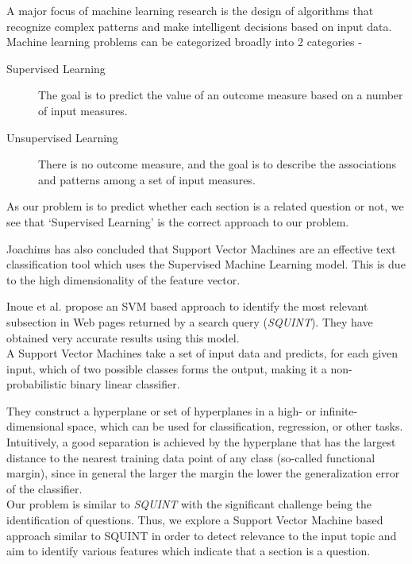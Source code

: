 \documentclass[10pt,a4paper]{report}
\begin{document}
A major focus of machine learning research is the design of algorithms that recognize complex patterns and make intelligent decisions based on input data\cite{wikiML}. \\

Machine learning problems can be categorized broadly into 2 categories\cite{elements} -

\begin{description}
	\item[Supervised Learning] The goal is to predict the value of an outcome measure based on a number of input measures.
	\item[Unsupervised Learning] There is no outcome measure, and the goal is to describe the associations and patterns among a set of input measures.
\end{description}

As our problem is to predict whether each section is a related question or not, we see that `Supervised Learning' is the correct approach to our problem.

Joachims has also concluded\cite{joachims} that Support Vector Machines are an effective text classification tool which uses the Supervised Machine Learning model. This is due to the high dimensionality of the feature vector\cite{squint}.

Inoue et al.\cite{squint} propose an SVM based approach to identify the most relevant subsection in Web pages returned by a search query (\textit{SQUINT}). They have obtained very accurate results using this model. \\

A Support Vector Machines take a set of input data and predicts, for each given input, which of two possible classes forms the output, making it a non-probabilistic binary linear classifier. 

They construct a hyperplane or set of hyperplanes in a high- or infinite-dimensional space, which can be used for classification, regression, or other tasks. Intuitively, a good separation is achieved by the hyperplane that has the largest distance to the nearest training data point of any class (so-called functional margin), since in general the larger the margin the lower the generalization error of the classifier\cite{wikiSVM}. \\

Our problem is similar to \textit{SQUINT} with the significant challenge being the identification of questions. Thus, we explore a Support Vector Machine based approach similar to SQUINT in order to detect relevance to the input topic and aim to identify various features which indicate that a section is a question.
\end{document}
